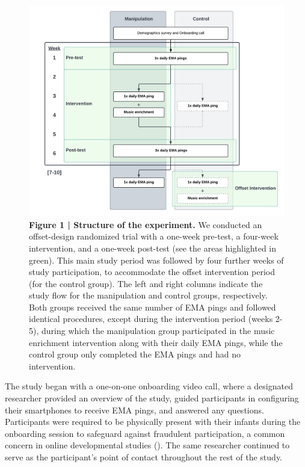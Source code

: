 \documentclass[
]{article}
\begin{document}
\begin{figure}[p]

{\centering \includegraphics[width=0.9\linewidth,]{../viz/figure1} 

}

\caption{\textbf{Figure 1 | Structure of the experiment.} We conducted an offset-design randomized trial with a one-week pre-test, a four-week intervention, and a one-week post-test (see the areas highlighted in green). This main study period was followed by four further weeks of study participation, to accommodate the offset intervention period (for the control group). The left and right columns indicate the study flow for the manipulation and control groups, respectively. Both groups received the same number of EMA pings and followed identical procedures, except during the intervention period (weeks 2-5), during which the manipulation group participated in the music enrichment intervention along with their daily EMA pings, while the control group only completed the EMA pings and had no intervention.}\label{fig:figure 1}
\end{figure}

The study began with a one-on-one onboarding video call, where a
designated researcher provided an overview of the study, guided
participants in configuring their smartphones to receive EMA pings, and
answered any questions. Participants were required to be physically
present with their infants during the onboarding session to safeguard
against fraudulent participation, a common concern in online
developmental studies (). The
same researcher continued to serve as the participant's point of contact
throughout the rest of the study.
\end{document}
